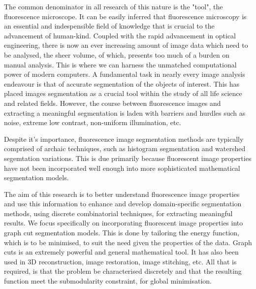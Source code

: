 The common denominator in all research of this nature is the "tool", the fluorescence microscope. 
It can be easily inferred that fluorescence microscopy is an essential and indespensible field of knowledge that is crucial to the advancement of human-kind. 
Coupled with the rapid advancement in optical engineering, there is now an ever increasing amount of image data which need to be analysed, the sheer volume, of which, presents too much of a burden on manual analysis. 
This is where we can harness the unmatched computational power of modern computers. 
A fundamental task in nearly every image analysis endeavour is that of accurate segmentation of the objects of interest. 
This has placed images segmentation as a crucial tool within the study of all life science and related fields. 
However, the course between fluorescence images and extracting a meaningful segmentation is laden with barriers and hurdles such as noise, extreme low contrast, non-uniform illumination, etc.

Despite it's importance, fluorescence image segmentation methods are typically comprised of archaic techniques, such as histogram segmentation and watershed segemtation variations. 
This is due primarily because fluorescent image properties have not been incorporated well enough into more sophisticated mathematical segmentation models. 

The aim of this research is to better understand fluorescence image properties and use this information
to enhance and develop domain-specific segmentation methods, using discrete combinatorial techniques, for extracting meaningful results. 
We focus specifically on incorporating fluorescent image properties into graph cut segmentation models. 
This is done by tailoring the energy function, which is to be minimised, to suit the need given the properties of the data.
Graph cuts is an extremely powerful and general mathematical tool. 
It has also been used in 3D reconstruction, image restoration, image stitching, etc. 
All that is required, is that the problem be characterised discretely and that the resulting function meet the submodularity constraint, for global minimisation.



